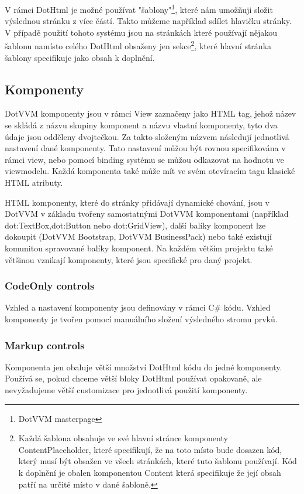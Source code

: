     V rámci DotHtml je možné používat "šablony"\footnote{DotVVM masterpage}, které nám umožňuji složit výslednou stránku z více částí. Takto můžeme například sdílet hlavičku stránky. V případě použití tohoto systému jsou na stránkách které používají nějakou šablonu namísto celého DotHtml obsaženy jen sekce\footnote{Každá šablona obsahuje ve své hlavní stránce komponenty ContentPlaceholder, které specifikují, že na toto místo bude dosazen kód, který musí být obsažen ve všech stránkách, které tuto šablonu používají. Kód k doplnění je obalen komponentou Content která specifikuje že její obsah patří na určité místo v dané šabloně.}, které hlavní stránka šablony specifikuje jako obsah k doplnění.

\subsection*{Komponenty}
DotVVM komponenty jsou v rámci View zaznačeny jako HTML tag, jehož název se skládá z názvu skupiny komponent a názvu vlastní komponenty, tyto dva údaje jsou odděleny dvojtečkou. Za takto složeným názvem následují jednotlivá nastavení dané komponenty. Tato nastavení můžou být rovnou specifikována v rámci view, nebo pomocí binding systému se můžou odkazovat na hodnotu ve viewmodelu. Každá komponenta také může mít ve svém otevíracím tagu klasické HTML atributy. 

HTML komponenty, které do stránky přidávají dynamické chování, jsou v DotVVM v základu tvořeny samostatnými DotVVM komponentami (například dot:TextBox,dot:Button nebo dot:GridView), další balíky komponent lze dokoupit (DotVVM Bootstrap, DotVVM BusinessPack) nebo také existují komunitou spravované balíky komponent. Na každém větším projektu také většinou vznikají komponenty, které jsou specifické pro daný projekt.

\subsubsection{CodeOnly controls}
Vzhled a nastavení komponenty jsou definovány v rámci C\# kódu.\newline
Vzhled komponenty je tvořen pomocí manuálního složení výsledného stromu prvků.

\subsubsection{Markup controls}
 Komponenta jen obaluje větší množství DotHtml kódu do jedné komponenty.\newline
 Používá se, pokud chceme větší bloky DotHtml používat opakovaně, ale nevyžadujeme větší customizace pro jednotlivá použití komponenty.
 
